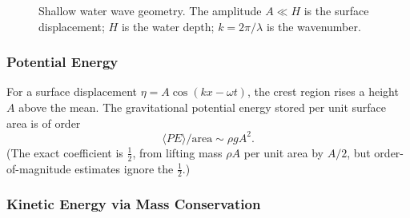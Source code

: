 \begin{figure}[ht]
    \centering
    \caption{Shallow water wave geometry. The amplitude $A\ll H$ is the surface
    displacement; $H$ is the water depth; $k=2\pi/\lambda$ is the wavenumber.}
    \label{fig:lec10:shallow-water}
\end{figure}

\subsubsection*{Potential Energy}

For a surface displacement $\eta = A\cos(kx-\omega t)$, the crest region
rises a height $A$ above the mean. The gravitational potential energy stored
per unit surface area is of order
\begin{equation}
    \langle PE\rangle/\text{area} \sim \rho g A^2.
    \label{eq:lec10:sw-pe}
\end{equation}
(The exact coefficient is $\tfrac{1}{2}$, from lifting mass $\rho A$ per unit
area by $A/2$, but order-of-magnitude estimates ignore the $\tfrac{1}{2}$.)

\subsubsection*{Kinetic Energy via Mass Conservation}


